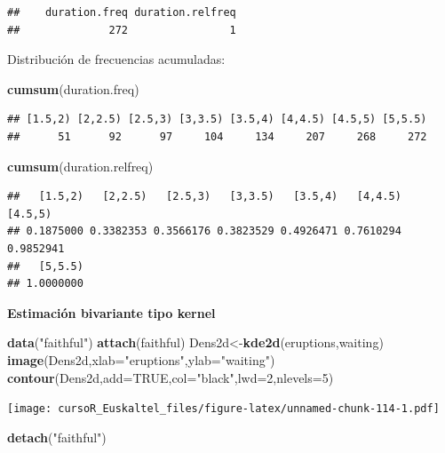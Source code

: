 \documentclass[]{book}
\newenvironment{Shaded}{\begin{snugshade}}{\end{snugshade}}
\newcommand{\KeywordTok}[1]{\textcolor[rgb]{0.13,0.29,0.53}{\textbf{#1}}}
\newcommand{\DataTypeTok}[1]{\textcolor[rgb]{0.13,0.29,0.53}{#1}}
\newcommand{\DecValTok}[1]{\textcolor[rgb]{0.00,0.00,0.81}{#1}}
\newcommand{\StringTok}[1]{\textcolor[rgb]{0.31,0.60,0.02}{#1}}
\newcommand{\OtherTok}[1]{\textcolor[rgb]{0.56,0.35,0.01}{#1}}
\newcommand{\NormalTok}[1]{#1}
\begin{document}
\begin{verbatim}
##    duration.freq duration.relfreq 
##              272                1
\end{verbatim}

Distribución de frecuencias acumuladas:

\begin{Shaded}
\begin{Highlighting}[]
\KeywordTok{cumsum}\NormalTok{(duration.freq)}
\end{Highlighting}
\end{Shaded}

\begin{verbatim}
## [1.5,2) [2,2.5) [2.5,3) [3,3.5) [3.5,4) [4,4.5) [4.5,5) [5,5.5) 
##      51      92      97     104     134     207     268     272
\end{verbatim}

\begin{Shaded}
\begin{Highlighting}[]
\KeywordTok{cumsum}\NormalTok{(duration.relfreq)}
\end{Highlighting}
\end{Shaded}

\begin{verbatim}
##   [1.5,2)   [2,2.5)   [2.5,3)   [3,3.5)   [3.5,4)   [4,4.5)   [4.5,5) 
## 0.1875000 0.3382353 0.3566176 0.3823529 0.4926471 0.7610294 0.9852941 
##   [5,5.5) 
## 1.0000000
\end{verbatim}

\textbf{Estimación bivariante tipo kernel}

\begin{Shaded}
\begin{Highlighting}[]
\KeywordTok{data}\NormalTok{(}\StringTok{"faithful"}\NormalTok{)}
\KeywordTok{attach}\NormalTok{(faithful)}
\NormalTok{Dens2d<-}\KeywordTok{kde2d}\NormalTok{(eruptions,waiting)}
\KeywordTok{image}\NormalTok{(Dens2d,}\DataTypeTok{xlab=}\StringTok{"eruptions"}\NormalTok{,}\DataTypeTok{ylab=}\StringTok{"waiting"}\NormalTok{)}
\KeywordTok{contour}\NormalTok{(Dens2d,}\DataTypeTok{add=}\OtherTok{TRUE}\NormalTok{,}\DataTypeTok{col=}\StringTok{"black"}\NormalTok{,}\DataTypeTok{lwd=}\DecValTok{2}\NormalTok{,}\DataTypeTok{nlevels=}\DecValTok{5}\NormalTok{)}
\end{Highlighting}
\end{Shaded}

\texttt{[image: cursoR\_Euskaltel\_files/figure-latex/unnamed-chunk-114-1.pdf]}

\begin{Shaded}
\begin{Highlighting}[]
\KeywordTok{detach}\NormalTok{(}\StringTok{"faithful"}\NormalTok{)}
\end{Highlighting}
\end{Shaded}
\end{document}
